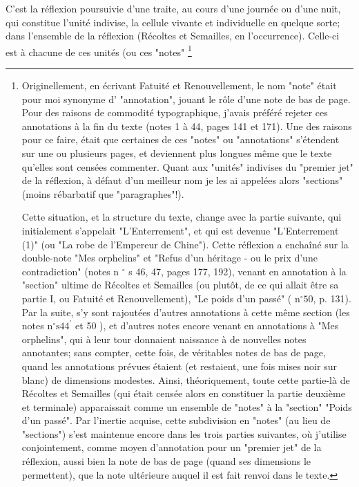 C'est la réflexion poursuivie d'une traite, au cours d'une journée ou d'une nuit, qui constitue l'unité indivise, la cellule vivante et individuelle en quelque sorte; dans l'ensemble de la réflexion (Récoltes et Semailles, en l'occurrence). Celle-ci est à chacune de ces unités (ou ces "notes" \footnote{Originellement, en écrivant Fatuité et Renouvellement, le nom "note" était pour moi synonyme d' "annotation", jouant le rôle d'une note de bas de page. Pour des raisons de commodité typographique, j'avais préféré rejeter ces annotations à la fin du texte (notes 1 à 44, pages 141 et 171). Une des raisons pour ce faire, était que certaines de ces "notes" ou "annotations" s'étendent sur une ou plusieurs pages, et deviennent plus longues même que le texte qu'elles sont censées commenter. Quant aux "unités" indivises du "premier jet" de la réflexion, à défaut d'un meilleur nom je les ai appelées alors "sections" (moins rébarbatif que "paragraphes"!).

Cette situation, et la structure du texte, change avec la partie suivante, qui initialement s'appelait "L'Enterrement", et qui est devenue "L'Enterrement (1)" (ou "La robe de l'Empereur de Chine"). Cette réflexion a enchaîné sur la double-note "Mes orphelins" et "Refus d'un héritage - ou le prix d'une contradiction" (notes n ${ }^{\circ}$ s 46, 47, pages 177, 192), venant en annotation à la "section" ultime de Récoltes et Semailles (ou plutôt, de ce qui allait être sa partie I, ou Fatuité et Renouvellement), "Le poids d'un passé" ( $\mathrm{n}^{\circ} 50$, p. 131). Par la suite, s'y sont rajoutées d'autres annotations à cette même section (les notes $\mathrm{n}^{\circ} \mathrm{s} 44^{\prime}$ et 50 ), et d'autres notes encore venant en annotations à "Mes orphelins", qui à leur tour donnaient naissance à de nouvelles notes annotantes; sans compter, cette fois, de véritables notes de bas de page, quand les annotations prévues étaient (et restaient, une fois mises noir sur blanc) de dimensions modestes. Ainsi, théoriquement, toute cette partie-là de Récoltes et Semailles (qui était censée alors en constituer la partie deuxième et terminale) apparaissait comme un ensemble de "notes" à la "section" "Poids d'un passé". Par l'inertie acquise, cette subdivision en "notes" (au lieu de "sections") s'est maintenue encore dans les trois parties suivantes, où j'utilise conjointement, comme moyen d'annotation pour un "premier jet" de la réflexion, aussi bien la note de bas de page (quand ses dimensions le permettent), que la note ultérieure auquel il est fait renvoi dans le texte.

}
